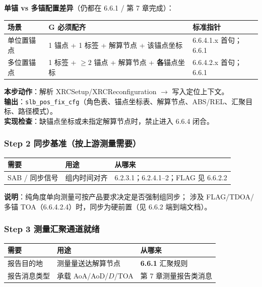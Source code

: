 \documentclass[11pt,a4paper]{ctexart}
\begin{document}
\textbf{单锚 vs 多锚配置差异}（仍都在 6.6.1 / 第 7 章完成）：

\begin{table}[h]
\centering
\small
\begin{tabular}{L{2.5cm}L{5.5cm}L{5.2cm}}
\toprule
\textbf{场景} & \textbf{G 必须配齐} & \textbf{标准指针} \\
\midrule
单位置锚点 & 1 锚点 + 1 标签 + 解算节点 + 该锚点坐标 & 6.6.4.1.x 首句；6.6.1 \\
多位置锚点 & 1 标签 + $\ge 2$ 锚点 + 解算节点 + \textbf{各}锚点坐标 & 6.6.4.2.x 首句；6.6.1 \\
\bottomrule
\end{tabular}
\end{table}

\textbf{本步动作}：解析 XRCSetup/XRCReconfiguration $\rightarrow$ 写入定位上下文。\\
\textbf{输出}：\texttt{slb\_pos\_fix\_cfg}（角色表、锚点坐标表、解算节点、ABS/REL、汇聚目标、路径模式）。\\
\textbf{实现检查}：缺锚点坐标或未指定解算节点时，禁止进入 6.6.4 闭合。

\subsubsection{Step 2 同步基准（按上游测量需要）}

\begin{table}[h]
\centering
\small
\begin{tabular}{L{3.4cm}L{4.8cm}L{4.8cm}}
\toprule
\textbf{需要} & \textbf{用途} & \textbf{从哪来} \\
\midrule
SAB / 同步信号 & 组内时间对齐 & 6.2.3.1；6.2.4.1--2；FLAG 见 6.6.2.2 \\
\bottomrule
\end{tabular}
\end{table}

\textbf{说明}：纯角度单向测量可按产品要求决定是否强制组同步；
涉及 FLAG/TDOA/多锚 TOA（6.6.4.2.4）时，同步为硬前置（见 6.6.2 端到端文档）。

\subsubsection{Step 3 测量汇聚通道就绪}

\begin{table}[h]
\centering
\small
\begin{tabular}{L{3.4cm}L{4.8cm}L{4.8cm}}
\toprule
\textbf{需要} & \textbf{用途} & \textbf{从哪来} \\
\midrule
报告目的地 & 测量量送达解算节点 & \textbf{6.6.1} 汇聚规则 \\
报告消息类型 & 承载 AoA/AoD/$D$/TOA & 第 7 章测量报告类消息 \\
\bottomrule
\end{tabular}
\end{table}
\end{document}
